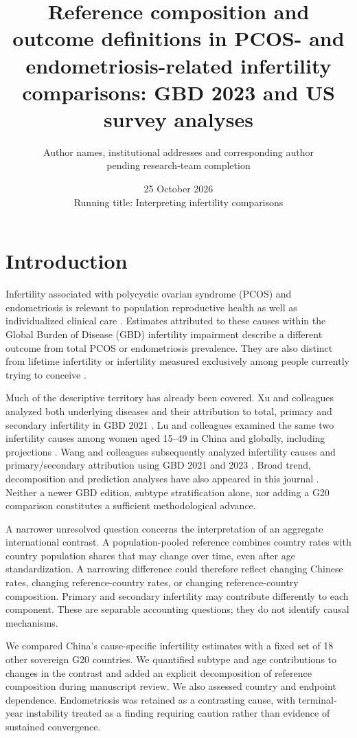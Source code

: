 \documentclass[11pt,a4paper]{article}
\title{Reference composition and outcome definitions in PCOS- and endometriosis-related infertility comparisons: GBD 2023 and US survey analyses}
\author{\parbox{0.9\textwidth}{\centering Author names, institutional addresses and corresponding author\\pending research-team completion}}
\date{25 October 2026\\{\small Running title: Interpreting infertility comparisons}}
\begin{document}
\maketitle
\linenumbers

\section{Introduction}
Infertility associated with polycystic ovarian syndrome (PCOS) and endometriosis is relevant to population reproductive health as well as individualized clinical care \cite{pcos,eshre}. Estimates attributed to these causes within the Global Burden of Disease (GBD) infertility impairment describe a different outcome from total PCOS or endometriosis prevalence. They are also distinct from lifetime infertility or infertility measured exclusively among people currently trying to conceive \cite{gbd}.

Much of the descriptive territory has already been covered. Xu and colleagues analyzed both underlying diseases and their attribution to total, primary and secondary infertility in GBD 2021 \cite{xu}. Lu and colleagues examined the same two infertility causes among women aged 15--49 in China and globally, including projections \cite{lu}. Wang and colleagues subsequently analyzed infertility causes and primary/secondary attribution using GBD 2021 and 2023 \cite{wang}. Broad trend, decomposition and prediction analyses have also appeared in this journal \cite{feng}. Neither a newer GBD edition, subtype stratification alone, nor adding a G20 comparison constitutes a sufficient methodological advance.

A narrower unresolved question concerns the interpretation of an aggregate international contrast. A population-pooled reference combines country rates with country population shares that may change over time, even after age standardization. A narrowing difference could therefore reflect changing Chinese rates, changing reference-country rates, or changing reference-country composition. Primary and secondary infertility may contribute differently to each component. These are separable accounting questions; they do not identify causal mechanisms.

We compared China's cause-specific infertility estimates with a fixed set of 18 other sovereign G20 countries. We quantified subtype and age contributions to changes in the contrast and added an explicit decomposition of reference composition during manuscript review. We also assessed country and endpoint dependence. Endometriosis was retained as a contrasting cause, with terminal-year instability treated as a finding requiring caution rather than evidence of sustained convergence.
\end{document}
